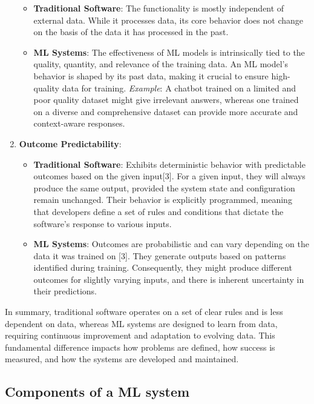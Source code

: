 \documentclass[
  letterpaper,
  DIV=11,
  numbers=noendperiod]{scrartcl}
\providecommand{\tightlist}{%
  \setlength{\itemsep}{0pt}\setlength{\parskip}{0pt}}\usepackage{longtable,booktabs,array}
\begin{document}
\begin{enumerate}
  \begin{itemize}
  \tightlist
  \item
    \textbf{Traditional Software}: The functionality is mostly
    independent of external data. While it processes data, its core
    behavior does not change on the basis of the data it has processed
    in the past.
  \item
    \textbf{ML Systems}: The effectiveness of ML models is intrinsically
    tied to the quality, quantity, and relevance of the training data.
    An ML model's behavior is shaped by its past data, making it crucial
    to ensure high-quality data for training. \emph{Example}: A chatbot
    trained on a limited and poor quality dataset might give irrelevant
    answers, whereas one trained on a diverse and comprehensive dataset
    can provide more accurate and context-aware responses.
  \end{itemize}
\item
  \textbf{Outcome Predictability}:

  \begin{itemize}
  \tightlist
  \item
    \textbf{Traditional Software}: Exhibits deterministic behavior with
    predictable outcomes based on the given input{[}3{]}. For a given
    input, they will always produce the same output, provided the system
    state and configuration remain unchanged. Their behavior is
    explicitly programmed, meaning that developers define a set of rules
    and conditions that dictate the software's response to various
    inputs.
  \item
    \textbf{ML Systems}: Outcomes are probabilistic and can vary
    depending on the data it was trained on {[}3{]}. They generate
    outputs based on patterns identified during training. Consequently,
    they might produce different outcomes for slightly varying inputs,
    and there is inherent uncertainty in their predictions.
  \end{itemize}
\end{enumerate}

In summary, traditional software operates on a set of clear rules and is
less dependent on data, whereas ML systems are designed to learn from
data, requiring continuous improvement and adaptation to evolving data.
This fundamental difference impacts how problems are defined, how
success is measured, and how the systems are developed and maintained.

\subsection{Components of a ML system}\label{components-of-a-ml-system}
\end{document}
